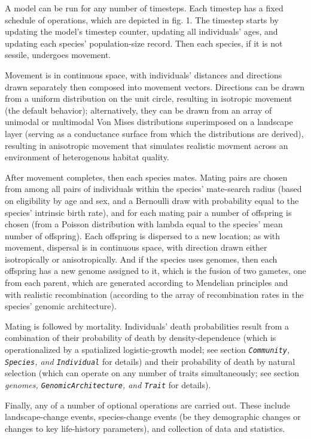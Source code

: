 ﻿\documentclass{article}
\begin{document}
A model can be run for any number of timesteps. Each timestep has a fixed schedule
of operations, which are depicted in fig. 1. The timestep starts by updating the
model's timestep counter, updating all individuals' ages, and updating each species'
population-size record. Then each species, if it is not sessile, undergoes movement. 

Movement is in continuous space, with individuals' distances
and directions drawn separately then composed into movement vectors. Directions can be
drawn from a uniform distribution on the unit circle, resulting in isotropic movement
(the default behavior); alternatively, they can be drawn from an array
of unimodal or multimodal Von Mises distributions superimposed on
a landscape layer (serving as a conductance surface from which the distributions
are derived), resulting in anisotropic movement that simulates realistic movment 
across an environment of heterogenous habitat quality.

After movement completes, then each species mates.
Mating pairs are chosen from among all pairs of 
individuals within the species' mate-search radius
(based on eligibility by age and sex, and a Bernoulli draw with probability equal
to the species' intrinsic birth rate), and for each mating pair a number of offspring
is chosen (from a Poisson distribution with lambda equal to the species' mean number
of offspring). Each offspring is dispersed to a new location; as with movement, dispersal
is in continuous space, with direction drawn either isotropically or
anisotropically. And if the species uses genomes, then each offspring has a new genome
assigned to it, which is the fusion of two gametes, one from each parent, which are
generated according to Mendelian principles and with realistic recombination (according
to the array of recombination rates in the species' genomic architecture).

Mating is followed by mortality. Individuals' death probabilities result from
a combination of their probability of death by density-dependence (which is
operationalized by a spatialized logistic-growth model; see section
\emph{\texttt{Community}, \texttt{Species}, and \texttt{Individual}} for details)
and their probability of death by natural selection (which can operate on any number
of traits simultaneously; see section
\emph{genomes, \texttt{GenomicArchitecture}, and \texttt{Trait}} for details). 

Finally, any of a number of optional operations are carried out. These include
landscape-change events, species-change events (be they demographic changes or
changes to key life-history parameters), and collection of data and statistics.
\end{document}
